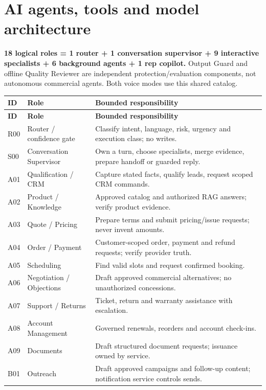 \documentclass[10.5pt,a4paper,oneside]{article}
\begin{document}
\section{AI agents, tools and model architecture}
\begin{keybox}
\textbf{18 logical roles = 1 router + 1 conversation supervisor + 9 interactive specialists + 6 background agents + 1 rep copilot.} Output Guard and offline Quality Reviewer are independent protection/evaluation components, not autonomous commercial agents. Both voice modes use this shared catalog.
\end{keybox}
\small
\begin{longtable}{@{}L{13mm}L{47mm}L{95mm}@{}}
\toprule{}\textbf{ID} & \textbf{Role} & \textbf{Bounded responsibility}\\\midrule
\endfirsthead\toprule{}\textbf{ID} & \textbf{Role} & \textbf{Bounded responsibility}\\\midrule\endhead
R00 & Router / confidence gate & Classify intent, language, risk, urgency and execution class; no writes.\\
S00 & Conversation Supervisor & Own a turn, choose specialists, merge evidence, prepare handoff or guarded reply.\\
A01 & Qualification / CRM & Capture stated facts, qualify leads, request scoped CRM commands.\\
A02 & Product / Knowledge & Approved catalog and authorized RAG answers; verify product evidence.\\
A03 & Quote / Pricing & Prepare terms and submit pricing/issue requests; never invent amounts.\\
A04 & Order / Payment & Customer-scoped order, payment and refund requests; verify provider truth.\\
A05 & Scheduling & Find valid slots and request confirmed booking.\\
A06 & Negotiation / Objections & Draft approved commercial alternatives; no unauthorized concessions.\\
A07 & Support / Returns & Ticket, return and warranty assistance with escalation.\\
A08 & Account Management & Governed renewals, reorders and account check-ins.\\
A09 & Documents & Draft structured document requests; issuance owned by service.\\
B01 & Outreach & Draft approved campaigns and follow-up content; notification service controls sends.\\

\end{longtable}
\end{document}
